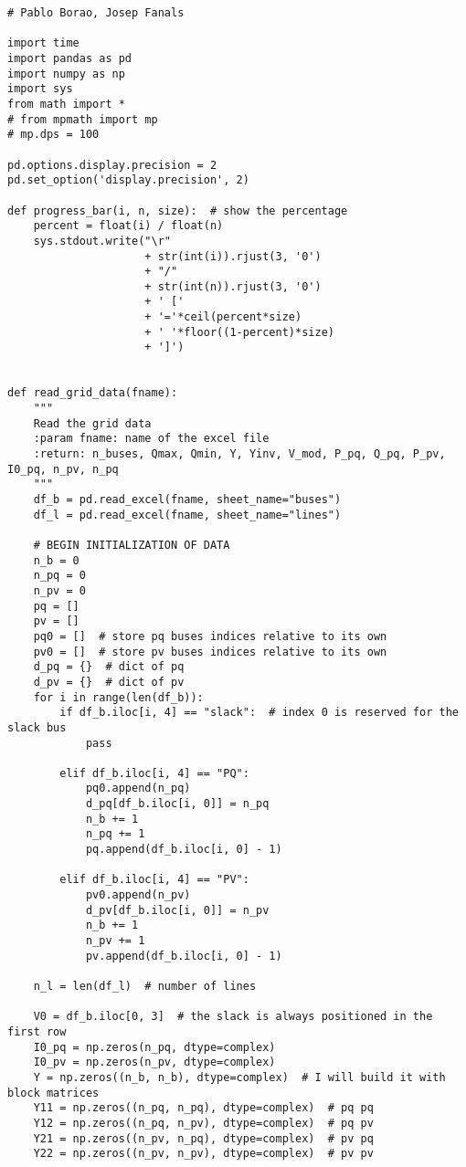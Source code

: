 \begin{lstlisting}[caption={Proper Generalized Decomposition code in Python}]
    # Pablo Borao, Josep Fanals

import time
import pandas as pd
import numpy as np
import sys
from math import *
# from mpmath import mp
# mp.dps = 100

pd.options.display.precision = 2
pd.set_option('display.precision', 2)

def progress_bar(i, n, size):  # show the percentage
    percent = float(i) / float(n)
    sys.stdout.write("\r"
                     + str(int(i)).rjust(3, '0')
                     + "/"
                     + str(int(n)).rjust(3, '0')
                     + ' ['
                     + '='*ceil(percent*size)
                     + ' '*floor((1-percent)*size)
                     + ']')


def read_grid_data(fname):
    """
    Read the grid data
    :param fname: name of the excel file
    :return: n_buses, Qmax, Qmin, Y, Yinv, V_mod, P_pq, Q_pq, P_pv, I0_pq, n_pv, n_pq
    """
    df_b = pd.read_excel(fname, sheet_name="buses")
    df_l = pd.read_excel(fname, sheet_name="lines")

    # BEGIN INITIALIZATION OF DATA
    n_b = 0
    n_pq = 0
    n_pv = 0
    pq = []
    pv = []
    pq0 = []  # store pq buses indices relative to its own
    pv0 = []  # store pv buses indices relative to its own
    d_pq = {}  # dict of pq
    d_pv = {}  # dict of pv
    for i in range(len(df_b)):
        if df_b.iloc[i, 4] == "slack":  # index 0 is reserved for the slack bus
            pass

        elif df_b.iloc[i, 4] == "PQ":
            pq0.append(n_pq)
            d_pq[df_b.iloc[i, 0]] = n_pq
            n_b += 1
            n_pq += 1
            pq.append(df_b.iloc[i, 0] - 1)

        elif df_b.iloc[i, 4] == "PV":
            pv0.append(n_pv)
            d_pv[df_b.iloc[i, 0]] = n_pv
            n_b += 1
            n_pv += 1
            pv.append(df_b.iloc[i, 0] - 1)

    n_l = len(df_l)  # number of lines

    V0 = df_b.iloc[0, 3]  # the slack is always positioned in the first row
    I0_pq = np.zeros(n_pq, dtype=complex)
    I0_pv = np.zeros(n_pv, dtype=complex)
    Y = np.zeros((n_b, n_b), dtype=complex)  # I will build it with block matrices
    Y11 = np.zeros((n_pq, n_pq), dtype=complex)  # pq pq
    Y12 = np.zeros((n_pq, n_pv), dtype=complex)  # pq pv
    Y21 = np.zeros((n_pv, n_pq), dtype=complex)  # pv pq
    Y22 = np.zeros((n_pv, n_pv), dtype=complex)  # pv pv


\end{lstlisting}
